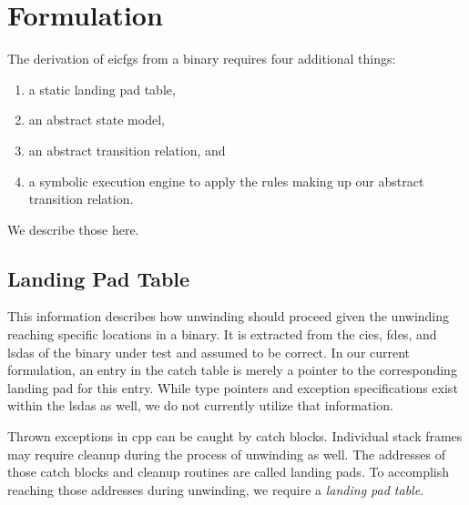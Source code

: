 \chapter{ Formulation}\label{ch:eicfg-formulation}
The derivation of \glspl{eicfg} from a binary requires four additional things:
\begin{enumerate}
    \item a static landing pad table,
    \item an abstract state model,
    \item an abstract transition relation, and
    \item a symbolic execution engine to apply the rules making up our abstract transition relation.
\end{enumerate}
We describe those here.

\section{Landing Pad Table}\label{sec:landing-pad-table}
This information describes how unwinding should proceed given the unwinding reaching specific locations in a binary.
It is extracted from the \glspl{cie}, \glspl{fde}, and \glspl{lsda} of the binary under test and assumed to be correct.
In our current formulation, an entry in the catch table is merely a pointer to the corresponding landing pad for this entry.
While type pointers and exception specifications exist within the \glspl{lsda} as well, we do not currently utilize that information.


Thrown exceptions in \gls{cpp} can be caught by catch blocks.
Individual stack frames may require cleanup during the process of unwinding as well.
The addresses of those catch blocks and cleanup routines are called landing pads.
To accomplish reaching those addresses during unwinding, we require a \emph{landing pad table}.

